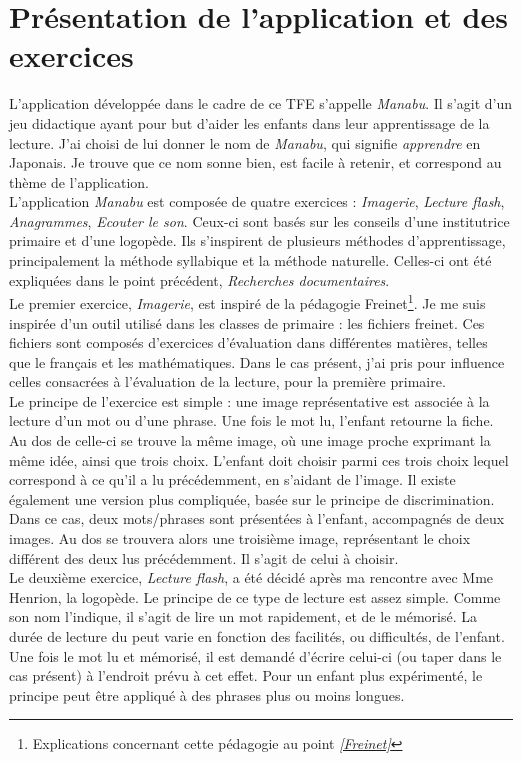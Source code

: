 \section{Présentation de l'application et des exercices}
L'application développée dans le cadre de ce TFE s'appelle \textit{Manabu}. Il s'agit d'un jeu didactique ayant pour but d'aider les enfants dans leur apprentissage de la lecture. J'ai choisi de lui donner le nom de \textit{Manabu}, qui signifie \textit{apprendre} en Japonais. Je trouve que ce nom sonne bien, est facile à retenir, et correspond au thème de l'application.\\

L'application \textit{Manabu} est composée de quatre exercices : \textit{Imagerie}, \textit{Lecture flash}, \textit{Anagrammes}, \textit{Ecouter le son}. Ceux-ci sont basés sur les conseils d'une institutrice primaire et d'une logopède. Ils s'inspirent de plusieurs méthodes d'apprentissage, principalement la méthode syllabique et  la méthode naturelle. Celles-ci ont été expliquées dans le point précédent, \textit{Recherches documentaires}.\\

Le premier exercice, \textit{Imagerie}, est inspiré de la pédagogie Freinet\footnote{Explications concernant cette pédagogie au point \textit{\ref{Freinet}}}. Je me suis inspirée d'un outil utilisé dans les classes de primaire : les fichiers freinet. Ces fichiers sont composés d'exercices d'évaluation dans différentes matières, telles que le français et les mathématiques. Dans le cas présent, j'ai pris pour influence celles consacrées à l'évaluation de la lecture, pour la première primaire.\\

Le principe de l'exercice est simple : une image représentative est associée à la lecture d'un mot ou d'une phrase. Une fois le mot lu, l'enfant retourne la fiche. Au dos de celle-ci se trouve la même image, où une image proche exprimant la même idée, ainsi que trois choix. L'enfant doit choisir parmi ces trois choix lequel correspond à ce qu'il a lu précédemment, en s'aidant de l'image. Il existe également une version plus compliquée, basée sur le principe de discrimination. Dans ce cas, deux mots/phrases sont présentées à l'enfant, accompagnés de deux images. Au dos se trouvera alors une troisième image, représentant le choix différent des deux lus précédemment. Il s'agit de celui à choisir.\\

Le deuxième exercice, \textit{Lecture flash}, a été décidé après ma rencontre avec Mme Henrion, la logopède. Le principe de ce type de lecture est assez simple. Comme son nom l'indique, il s'agit de lire un mot rapidement, et de le mémorisé. La durée de lecture du peut varie en fonction des facilités, ou difficultés, de l'enfant. Une fois le mot lu et mémorisé, il est demandé d'écrire celui-ci (ou taper dans le cas présent) à l'endroit prévu à cet effet. Pour un enfant plus expérimenté, le principe peut être appliqué à des phrases plus ou moins longues.\\

